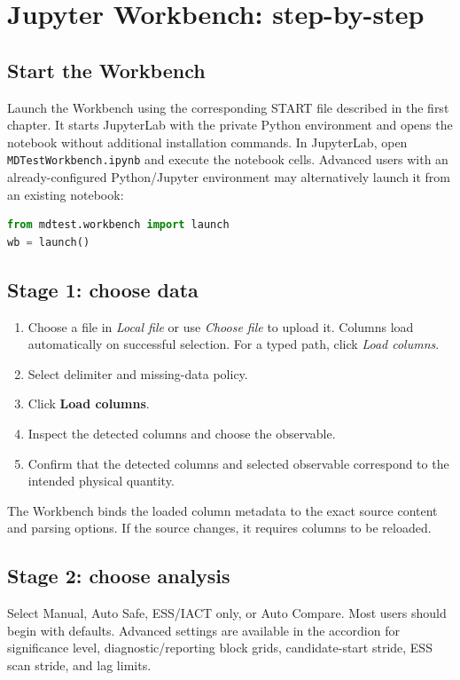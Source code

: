 \documentclass[11pt,oneside]{report}
\begin{document}
\chapter{Jupyter Workbench: step-by-step}
\section{Start the Workbench}
Launch the Workbench using the corresponding START file described in the first chapter. It starts JupyterLab with the private Python environment and opens the notebook without additional installation commands.
In JupyterLab, open \texttt{MDTestWorkbench.ipynb} and execute the notebook cells.  Advanced users with an already-configured Python/Jupyter environment may alternatively launch it from an existing notebook:
\begin{lstlisting}[language=Python]
from mdtest.workbench import launch
wb = launch()
\end{lstlisting}

\section{Stage 1: choose data}
\begin{enumerate}
\item Choose a file in \emph{Local file} or use \emph{Choose file} to upload it. Columns load automatically on successful selection. For a typed path, click \emph{Load columns}.
\item Select delimiter and missing-data policy.
\item Click \textbf{Load columns}.
\item Inspect the detected columns and choose the observable.
\item Confirm that the detected columns and selected observable correspond to the intended physical quantity.
\end{enumerate}
The Workbench binds the loaded column metadata to the exact source content and parsing options. If the source changes, it requires columns to be reloaded.

\section{Stage 2: choose analysis}
Select Manual, Auto Safe, ESS/IACT only, or Auto Compare. Most users should begin with defaults. Advanced settings are available in the accordion for significance level, diagnostic/reporting block grids, candidate-start stride, ESS scan stride, and lag limits.
\end{document}
